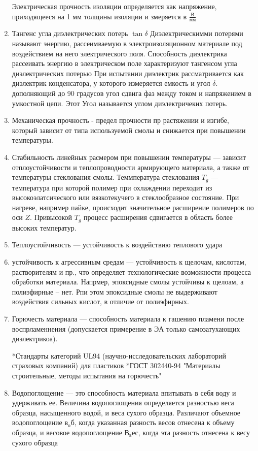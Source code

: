 \documentclass{article}
\begin{document}
\begin{enumerate}
Электрическая прочность изоляции определяется как напряжение, приходящееся на 1 мм толщины изоляции и змеряется в $\frac {В} {мм}$

	\item Тангенс угла диэлектрических потерь $\tan{\delta}$
Диэлектрическимми потерями называют энергию, рассеимваемую в электроизоляционном материале под воздействием на него электрического поля.
Способность диэлектрика рассеивать энергию в электрическом поле характеризуют тангенсом угла диэлектрических потерью
При испытании диэлектрик рассматривается как диэлектрик конденсатора, у которого измеряется емкость и угол $\delta$. дополняющий до 90 градусов угол сдвига фаз между током и напряжением в умкостной цепи. Этот Угол называется углом диэлектричеких потерь.

	\item Механическая прочность - предел прочности пр растяжении и изгибе, который зависит от типа используемой смолы и снижается при повышении температуры.
	\item Стабильность линейных расмером при повышении температуры --- зависит отплоустойчивости и теплопроводности армирующего материала, а также от температуры стеклования смолы.
Теммпература стеклования $T_g$ --- температура при которой полимер при охлаждении переходит из высокоэлатсического или вязкотекучего в стеклообразное состояние.
При нагреве, например пайке, происходит значительное расширение полимеров по оси $Z$. Привысокой $T_g$ процесс расширения сдвигается в область более высоких температур.
	\item Теплоустойчивость --- устойчивость к воздействию теплового удара
	\item устойчивость к агрессивным средам --- устойчивость к щелочам, кислотам, растворителям и пр., что определяет технологические возможности процесса обработки материала.
Напрмер, эпоксидные смолы устойчивы к щелоам, а полиэфирные -- нет. Рпи этом эпоксидные смолы не выдерживают воздействия сильных кислот, в отличие от полиэфирных.
	\item Горючесть материала --- способность материала к гашению пламени после воспрламеннения (допускается примерение в ЭА только самозатухающих диэлектрикоа).

*Стандарты категорий UL94 (научно-исследовательских лабораторий страховых компаний) для пластиков
*ГОСТ 302440-94 "Материалы строительные, методы испытания на горючесть"

	\item Водопоглощение --- это способность материала впитывать в себя воду и удерживать ее. Величина водопоглощения определяется разностью веса образца, насыщенного водой, и веса сухого образца. Различают объемное водопоглощение $в_об$, когда указанная разность весов отнесена к объему образца, и весовое водопоглощение $В_вес$, когда эта разность отнесена к весу сухого образца


\end{enumerate}
\end{document}
